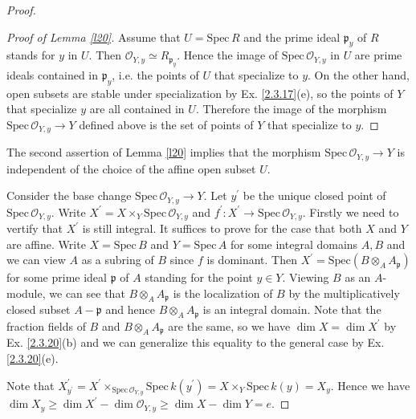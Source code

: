 \begin{proof}
\begin{proof}[Proof of Lemma \ref*{l20}]
		Assume that $U=\mathrm{Spec}\,R$ and the prime ideal $\mathfrak{p}_y$ of $R$ stands for $y$ in $U$. Then $\mathcal{O}_{Y,y}\simeq R_{\mathfrak{p}_y}$. Hence the image of $\mathrm{Spec}\,\mathcal{O}_{Y,y}$ in $U$ are prime ideals contained in $\mathfrak{p}_y$, i.e. the points of $U$ that specialize to $y$. On the other hand, open subsets are stable under specialization by Ex. \ref{2.3.17}(e), so the points of $Y$ that specialize $y$ are all contained in $U$. Therefore the image of the morphism $\mathrm{Spec}\,\mathcal{O}_{Y,y}\to Y$ defined above is the set of points of $Y$ that specialize to $y$.
	\end{proof}
	\begin{rmk}
		The second assertion of Lemma \ref{l20} implies that the morphism $\mathrm{Spec}\,\mathcal{O}_{Y,y}\to Y$ is independent of the choice of the affine open subset $U$.
	\end{rmk}
	Consider the base change $\mathrm{Spec}\,\mathcal{O}_{Y,y}\to Y$. Let $y^{\prime}$ be the unique closed point of $\mathrm{Spec}\,\mathcal{O}_{Y,y}$. Write $X^{\prime}=X\times_{Y}\mathrm{Spec}\,\mathcal{O}_{Y,y}$ and $f^{\prime}:X^{\prime}\to\mathrm{Spec}\,\mathcal{O}_{Y,y}$. Firstly we need to vertify that $X^{\prime}$ is still integral. It suffices to prove for the case that both $X$ and $Y$ are affine. Write $X=\mathrm{Spec}\,B$ and $Y=\mathrm{Spec}\,A$ for some integral domains $A,B$ and we can view $A$ as a subring of $B$ since $f$ is dominant. Then $X^{\prime}=\mathrm{Spec}(B\otimes_{A}A_{\mathfrak{p}})$ for some prime ideal $\mathfrak{p}$ of $A$ standing for the point $y\in Y$. Viewing $B$ as an $A$-module, we can see that $B\otimes_{A}A_{\mathfrak{p}}$ is the localization of $B$ by the multiplicatively closed subset $A-\mathfrak{p}$ and hence $B\otimes_{A}A_{\mathfrak{p}}$ is an integral domain. Note that the fraction fields of $B$ and $B\otimes_{A}A_{\mathfrak{p}}$ are the same, so we have $\dim X=\dim X^{\prime}$ by Ex. \ref{2.3.20}(b) and we can generalize this equality to the general case by Ex. \ref{2.3.20}(e).
	
	Note that $X^{\prime}_{y^{\prime}}=X^{\prime}\times_{\mathrm{Spec}\,\mathcal{O}_{Y,y}}\mathrm{Spec}\,k(y^{\prime})=X\times_Y\mathrm{Spec}\,k(y)=X_y$. Hence we have $\dim X_y\geq\dim X^{\prime}-\dim\mathcal{O}_{Y,y}\geq\dim X-\dim Y=e$.
	

\end{proof}
